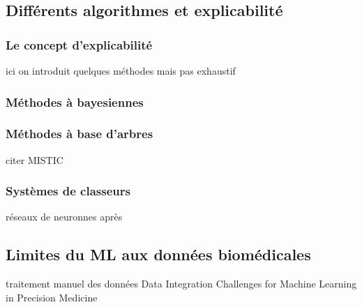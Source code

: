 \subsection{Différents algorithmes et explicabilité}
\subsubsection{Le concept d'explicabilité}
ici on introduit quelques méthodes mais pas exhaustif
\subsubsection{Méthodes à bayesiennes}
\subsubsection{Méthodes à base d'arbres}
citer MISTIC
\subsubsection{Systèmes de classeurs}

réseaux de neuronnes après

\subsection{Limites du ML aux données biomédicales}
traitement manuel des données 
Data Integration Challenges for Machine Learning in Precision Medicine